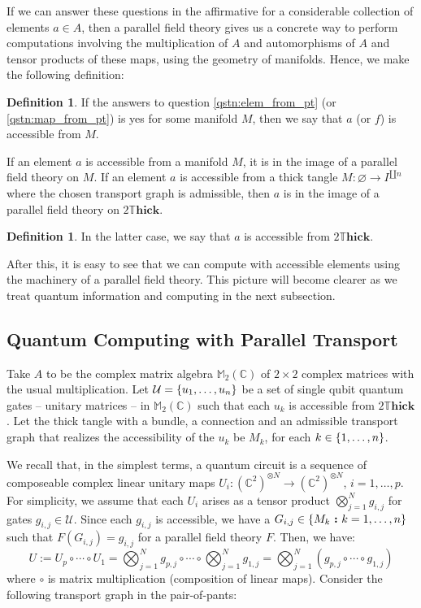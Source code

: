 \documentclass{amsart}
\newcommand{\M}{\mathbb{M}}
\newcommand{\C}{\mathbb{C}}
\newcommand{\tensor}{\otimes}
\renewcommand{\to}[1][]{\stackrel{#1}{\longrightarrow}}
\newcommand{\curly}[1]{\left\{ #1 \right\}}
\newcommand{\set}[2][]{\ifthenelse{\equal{#1}{}}
                                  {\curly{#2}}
                                  {\curly{#1\ \textbf{:}\ #2}}}
\newcommand{\DThick}{2\mathbb{T}\mathbf{hick}}
\newcommand{\TODO}[1]{{\color{blue!55!black} *** TODO: #1 ***}}
\numberwithin{thm}{section}
\theoremstyle{definition}
\newtheorem{defn}[thm]{Definition}
\begin{document}

If we can answer these questions in the affirmative for a considerable
collection of elements $a \in A$, then a parallel field theory gives us a
concrete way to perform computations involving the multiplication of $A$ and
automorphisms of $A$ and tensor products of these maps, using the geometry of
manifolds. Hence, we make the following definition:

\begin{defn}
If the answers to question \ref{qstn:elem_from_pt} (or \ref{qstn:map_from_pt})
is yes for some manifold $M$, then we say that $a$ (or $f$) is accessible from
$M$.
\end{defn}

If an element $a$ is accessible from a manifold $M$, it is in the image of a
parallel field theory on $M$.
If an element $a$ is accessible from a thick tangle
$M : \varnothing \to I^{\amalg n}$ where the chosen transport graph is
admissible, then $a$ is in the image of a parallel field theory on $\DThick$.

\begin{defn}
In the latter case, we say that $a$ is accessible from $\DThick$.
\end{defn}

After this, it is easy to see
that we can compute with accessible elements using the machinery of a parallel
field theory. This picture will become clearer as we treat quantum information
and computing in the next subsection.

%

\subsection{Quantum Computing with Parallel Transport}

Take $A$ to be the complex matrix algebra $\M_2(\C)$ of $2 \times 2$ complex
matrices with the usual multiplication. Let
$\mathcal{U} = \set{u_1, \dots, u_n}$ be a set
of single qubit quantum gates -- unitary matrices -- in $\M_2(\C)$ such that
each $u_k$ is accessible from $\DThick$. Let the thick tangle with a bundle,
a connection and an admissible transport graph that realizes the accessibility
of the $u_k$ be $M_k$, for each $k \in \set{1, \dots, n}$.

We recall that, in the simplest terms, a quantum circuit is a sequence of
composeable complex linear unitary maps
$U_i : (\C^2)^{\tensor N} \to (\C^2)^{\tensor N}$, $i = 1, \dots, p$.
For simplicity, we assume that
each $U_i$ arises as a tensor product $\bigotimes_{j = 1}^{N} g_{i, j}$ for
gates $g_{i, j} \in \mathcal{U}$. Since each $g_{i, j}$ is accessible, we have
a $G_{i, j} \in \set[M_k]{k = 1, \dots, n}$ such that $F(G_{i, j}) = g_{i, j}$
for a parallel field theory $F$. Then, we have:
\[
 U := U_p \circ \cdots \circ U_1
  = \bigotimes_{j = 1}^{N} g_{p, j} \circ \cdots
    \circ \bigotimes_{j = 1}^{N} g_{1, j}
  = \bigotimes_{j = 1}^{N} (g_{p, j} \circ \cdots \circ g_{1, j})
\]
where $\circ$ is matrix multiplication (composition of linear maps). Consider
the following transport graph in the pair-of-pants:
\end{document}
